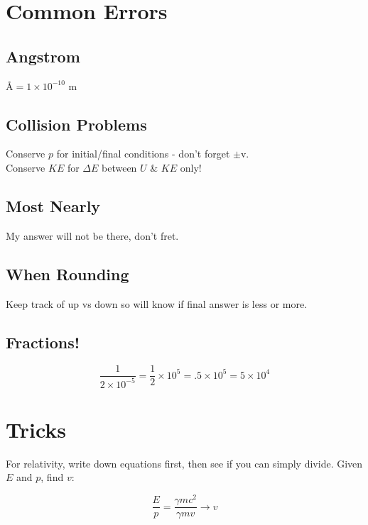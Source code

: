 \documentclass[10pt,a4paper]{article}
\begin{document}


\section{Common Errors} %
\label{sec:common_errors}
\subsection{Angstrom} %
\label{sub:angstrom}
\AA $= 1 \times 10^{-10}$ m

\subsection{Collision Problems} %
\label{sub:collision_problems}
Conserve $p$ for initial/final conditions - don't forget $\pm$v. \\
Conserve $KE$ for $\Delta E$ between $U$ \& $KE$ only!

\subsection{Most Nearly} %
\label{sub:most_nearly}
My answer will not be there, don't fret.

\subsection{When Rounding} %
\label{sub:when_rounding}
Keep track of up vs down so will know if final answer is less or more.

\subsection{Fractions!} %
\label{sub:fractions_}
\begin{equation}
    \frac{1}{2 \times 10^{-5}} = \frac{1}{2}\times 10^{5} = .5 \times 10^{5} = 5 \times 10^4
\end{equation}


\section{Tricks} %
\label{sec:tricks}
For relativity, write down equations first, then see if you can simply divide. Given $E$ and $p$, find $v$:

\begin{equation}
\frac{E}{p} = \frac{\gamma mc^2}{\gamma mv} \rightarrow v
\end{equation}
\end{document}
